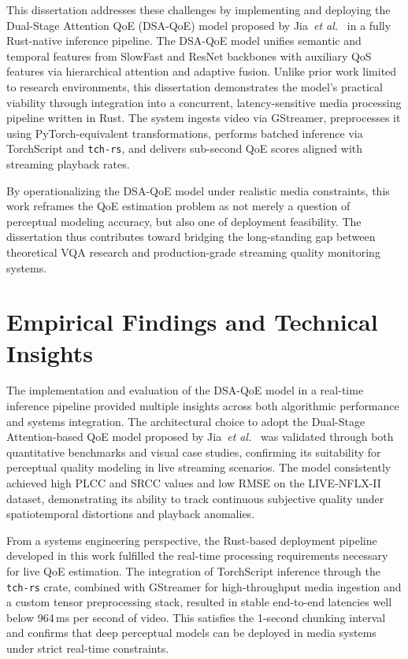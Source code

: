 This dissertation addresses these challenges by implementing and deploying the Dual-Stage Attention QoE (DSA-QoE) model proposed by Jia~\textit{et al.}~\cite{jia2024continuous} in a fully Rust-native inference pipeline. The DSA-QoE model unifies semantic and temporal features from SlowFast and ResNet backbones with auxiliary QoS features via hierarchical attention and adaptive fusion. Unlike prior work limited to research environments, this dissertation demonstrates the model's practical viability through integration into a concurrent, latency-sensitive media processing pipeline written in Rust. The system ingests video via GStreamer, preprocesses it using PyTorch-equivalent transformations, performs batched inference via TorchScript and \texttt{tch-rs}, and delivers sub-second QoE scores aligned with streaming playback rates.

By operationalizing the DSA-QoE model under realistic media constraints, this work reframes the QoE estimation problem as not merely a question of perceptual modeling accuracy, but also one of deployment feasibility. The dissertation thus contributes toward bridging the long-standing gap between theoretical VQA research and production-grade streaming quality monitoring systems.

\section{Empirical Findings and Technical Insights}

The implementation and evaluation of the DSA-QoE model in a real-time inference pipeline provided multiple insights across both algorithmic performance and systems integration. The architectural choice to adopt the Dual-Stage Attention-based QoE model proposed by Jia~\textit{et al.}~\cite{jia2024continuous} was validated through both quantitative benchmarks and visual case studies, confirming its suitability for perceptual quality modeling in live streaming scenarios. The model consistently achieved high PLCC and SRCC values and low RMSE on the LIVE-NFLX-II dataset, demonstrating its ability to track continuous subjective quality under spatiotemporal distortions and playback anomalies.

From a systems engineering perspective, the Rust-based deployment pipeline developed in this work fulfilled the real-time processing requirements necessary for live QoE estimation. The integration of TorchScript inference through the \texttt{tch-rs} crate, combined with GStreamer for high-throughput media ingestion and a custom tensor preprocessing stack, resulted in stable end-to-end latencies well below 964\,ms per second of video. This satisfies the 1-second chunking interval and confirms that deep perceptual models can be deployed in media systems under strict real-time constraints.


